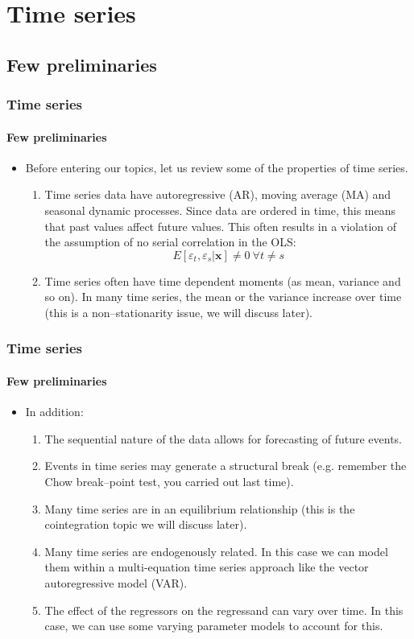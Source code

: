 \documentclass[xcolor=pdftex,t,11pt]{beamer}
\makeatletter
\newenvironment{stepenumeratewithalert}{\begin{enumerate}[<+-| alert@+>]}{\end{enumerate}}
\newenvironment{stepitemizewithalert}{\begin{itemize}[<+-| alert@+>]}{\end{itemize} }
\makeatother
\begin{document}
\section{Time series}
\subsection{Few preliminaries}
\begin{frame}
\frametitle{Time series}
\framesubtitle{Few preliminaries}
\begin{stepitemizewithalert}
\item Before entering our topics, let us review some of the properties of time series.\medskip
\begin{stepenumeratewithalert}[Prop. 1:]
\item Time series data have autoregressive (AR), moving average (MA) and seasonal dynamic processes. Since data are ordered in time, this means that past values affect future values. This often results in a violation of the assumption of no serial correlation in the OLS:\medskip
\begin{equation*}
E\left[\varepsilon_{t},\varepsilon_{s}|\mathbf{x}\right]\neq0 \ \forall t\neq s
\end{equation*}
\item Time series often have time dependent moments (as mean, variance and so on). In many time series, the mean or the variance increase over time (this is a non--stationarity issue, we will discuss later).
\end{stepenumeratewithalert}
\end{stepitemizewithalert}
\end{frame}



\begin{frame}
\frametitle{Time series}
\framesubtitle{Few preliminaries}
\begin{stepitemizewithalert}
\item In addition:\medskip
\begin{stepenumeratewithalert}[Prop. 1:]
\addtocounter{enumi}{2}
\item The sequential nature of the data allows for forecasting of future events.\medskip
\item Events in time series may generate a structural break (e.g. remember the Chow break--point test, you carried out last time).\medskip
\item Many time series are in an equilibrium relationship (this is the cointegration topic we will discuss later).\medskip
\item Many time series are endogenously related. In this case we can model them within a multi-equation time series approach like the vector autoregressive model (VAR).\medskip
\item The effect of the regressors on the regressand can vary over time. In this case, we can use some varying parameter models to account for this.
\end{stepenumeratewithalert}
\end{stepitemizewithalert}
\end{frame}
\end{document}
